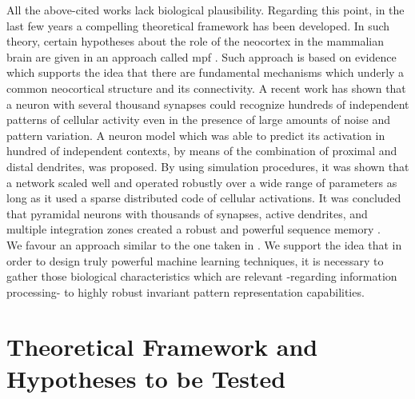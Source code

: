 \documentclass[11pt,a4paper]{article}
\begin{document}
All the above-cited works lack biological plausibility.
Regarding this point, in the last few years a compelling
theoretical framework has been developed.
In such theory, certain hypotheses about the role of
the neocortex in the mammalian brain are given in an
approach called \gls{mpf}
\cite{hawkins_2004}.
Such approach is based on evidence
which supports the idea that there are fundamental
mechanisms which underly a common neocortical
structure and its connectivity.
A recent work has shown that a neuron with
several thousand synapses could recognize hundreds
of independent patterns of cellular activity even
in the presence of large amounts of
noise and pattern variation.
A neuron model which was able to predict its activation in hundred 
of independent contexts, by means of
the combination of proximal and distal dendrites, was proposed.
By using simulation procedures, it was shown that a network
scaled well and operated robustly over a wide range of parameters as long as it
used a sparse distributed code of cellular activations.
It was concluded that pyramidal neurons with thousands of
synapses, active dendrites, and multiple integration zones
created a robust and powerful
sequence memory \cite{hawkins_2016}. \\

We favour an approach similar to the one taken in \cite{hawkins_2016}.
We support the idea that in order to design truly powerful machine
learning techniques,
it is necessary to gather those biological characteristics which are
relevant -regarding information processing- to highly
robust invariant pattern representation capabilities. \\













\section{Theoretical Framework and Hypotheses to be Tested}
\end{document}
